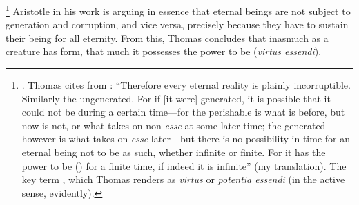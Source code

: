 %
\footnote{\Cite[q.~5, a.~4, ad 1]{st:depotentia}. Thomas cites from \cite[I, 12, 281b 25-32]{aristotle:decaelo}:  ``Therefore every eternal reality is plainly incorruptible. Similarly the ungenerated. For if [it were] generated, it is possible that it could not be during a certain time---for the perishable is what is before, but now is not, or what takes on non-\emph{esse} at some later time; the generated however is what takes on \emph{esse} later---but there is no possibility in time for an eternal being not to be as such, whether infinite or finite. For it has the power to be () for a finite time, if indeed it is infinite'' (my translation). The key term , which Thomas renders as \emph{virtus} or \emph{potentia essendi} (in the active sense, evidently).}
%
Aristotle in his work is arguing in essence that eternal beings are not subject to generation and corruption, and vice versa, precisely because they have  to sustain their being for all eternity. From this, Thomas concludes that inasmuch as a creature has form, that much it possesses the power to be (\emph{virtus essendi}).%
%
